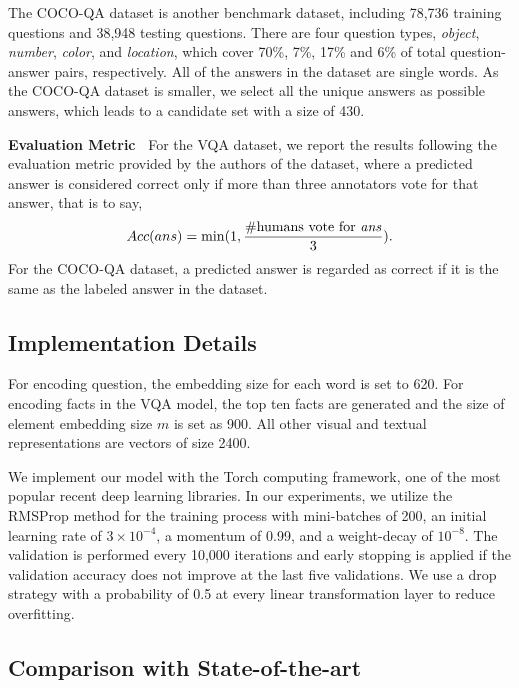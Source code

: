 \documentclass[sigconf]{acmart}
\begin{document}
The COCO-QA dataset is another benchmark dataset, including 78,736 training questions and 38,948 testing questions. There are four question types, \textit{object}, \textit{number}, \textit{color}, and \textit{location}, which cover 70\%, 7\%, 17\% and 6\% of total question-answer pairs, respectively. All of the answers in the dataset are single words. As the COCO-QA dataset is smaller, we select all the unique answers as possible answers, which leads to a candidate set with a size of 430.


\textbf{Evaluation Metric~} 
For the VQA dataset, we report the results following the evaluation metric provided by the authors of the dataset, where a predicted answer is considered correct only if more than three annotators vote for that answer, that is to say, 
\begin{align}
	Acc(ans) = \min (1 , \frac{\text{\#humans vote for \textit{ans}} }{3}  ).
\end{align}
For the COCO-QA dataset, a predicted answer is regarded as correct if it is the same as the labeled answer in the dataset.




\subsection{Implementation Details}

For encoding question, the embedding size for each word is set to 620. For encoding facts in the VQA model, the top ten facts are generated and the size of element embedding size $m$ is set as 900.  All other visual and textual representations are vectors of size 2400.





We implement our model with the Torch computing framework, one of the most popular recent deep learning libraries. In our experiments, we utilize the RMSProp method for the training process with mini-batches of 200, an initial learning rate of $3\times 10^{-4}$, a momentum of 0.99, and a weight-decay of $10^{-8}$. The validation is performed every 10,000 iterations and early stopping is applied if the validation accuracy does not improve at the last five validations. We use a drop strategy with a probability of 0.5 at every linear transformation layer to reduce overfitting.


\subsection{Comparison with State-of-the-art}
\end{document}
